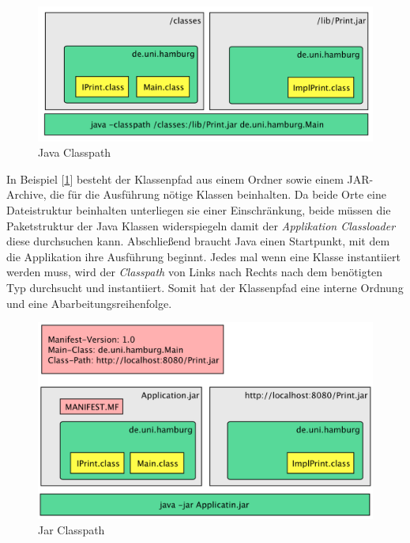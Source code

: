 \begin{figure}[h]
  \includegraphics[width=\textwidth]{material/images/Classpath-Simple.png}
  \caption{Java Classpath}
  \label{fig:Classpath-Simple}
\end{figure}

 In Beispiel [\ref{fig:Classpath-Simple}] besteht der Klassenpfad aus einem Ordner sowie einem JAR-Archive, die für die Ausführung nötige Klassen beinhalten. Da beide Orte eine Dateistruktur beinhalten unterliegen sie einer Einschränkung, beide müssen die Paketstruktur der Java Klassen widerspiegeln damit der \textit{Applikation Classloader} diese durchsuchen kann. Abschließend braucht Java einen Startpunkt, mit dem die Applikation ihre Ausführung beginnt. Jedes mal wenn eine Klasse instantiiert werden muss, wird der \textit{Classpath} von Links nach Rechts nach dem benötigten Typ durchsucht und instantiiert. Somit hat der Klassenpfad eine interne Ordnung und eine Abarbeitungsreihenfolge.
\begin{figure}[h]
  \includegraphics[width=\textwidth]{material/images/Classpath-Advanced.png}
  \caption{Jar Classpath}
  \label{fig:Classpath-Advanced}
\end{figure}

